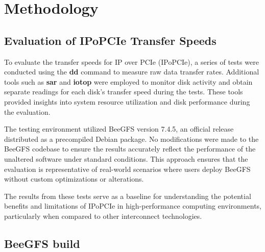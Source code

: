 \chapter{Methodology}

\section{Evaluation of IPoPCIe Transfer Speeds}

To evaluate the transfer speeds for IP over PCIe (IPoPCIe), a series of tests were conducted using the \textbf{dd} command to measure raw data transfer rates. Additional tools such as \textbf{sar} and \textbf{iotop} were employed to monitor disk activity and obtain separate readings for each disk’s transfer speed during the tests. These tools provided insights into system resource utilization and disk performance during the evaluation.

The testing environment utilized BeeGFS version 7.4.5, an official release distributed as a precompiled Debian package. No modifications were made to the BeeGFS codebase to ensure the results accurately reflect the performance of the unaltered software under standard conditions. This approach ensures that the evaluation is representative of real-world scenarios where users deploy BeeGFS without custom optimizations or alterations.

The results from these tests serve as a baseline for understanding the potential benefits and limitations of IPoPCIe in high-performance computing environments, particularly when compared to other interconnect technologies.

\section{BeeGFS build}

